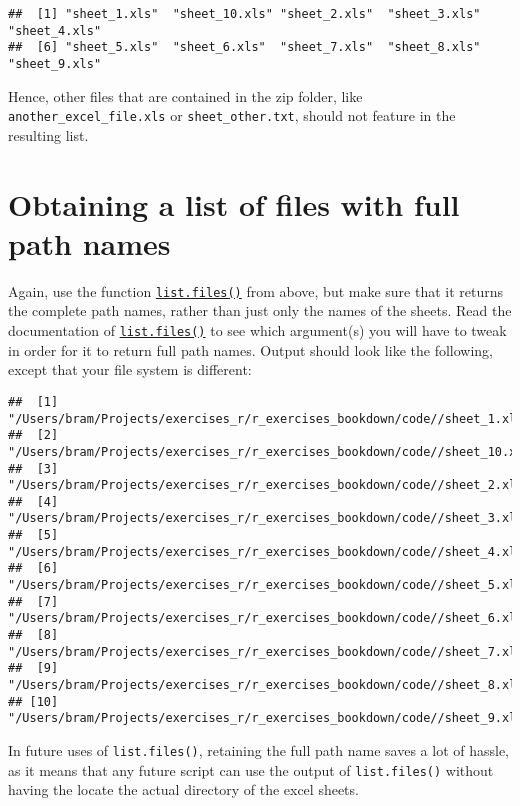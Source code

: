 \documentclass[
]{book}
\begin{document}
\begin{verbatim}
##  [1] "sheet_1.xls"  "sheet_10.xls" "sheet_2.xls"  "sheet_3.xls"  "sheet_4.xls" 
##  [6] "sheet_5.xls"  "sheet_6.xls"  "sheet_7.xls"  "sheet_8.xls"  "sheet_9.xls"
\end{verbatim}

Hence, other files that are contained in the zip folder, like \texttt{another\_excel\_file.xls} or \texttt{sheet\_other.txt}, should not feature in the resulting list.

\hypertarget{fileList}{%
\section{Obtaining a list of files with full path names}\label{fileList}}

Again, use the function \href{https://stat.ethz.ch/R-manual/R-patched/library/base/html/list.files.html}{\texttt{list.files()}} from above, but make sure that it returns the complete path names, rather than just only the names of the sheets. Read the documentation of \href{https://stat.ethz.ch/R-manual/R-patched/library/base/html/list.files.html}{\texttt{list.files()}} to see which argument(s) you will have to tweak in order for it to return full path names. Output should look like the following, except that your file system is different:

\begin{verbatim}
##  [1] "/Users/bram/Projects/exercises_r/r_exercises_bookdown/code//sheet_1.xls" 
##  [2] "/Users/bram/Projects/exercises_r/r_exercises_bookdown/code//sheet_10.xls"
##  [3] "/Users/bram/Projects/exercises_r/r_exercises_bookdown/code//sheet_2.xls" 
##  [4] "/Users/bram/Projects/exercises_r/r_exercises_bookdown/code//sheet_3.xls" 
##  [5] "/Users/bram/Projects/exercises_r/r_exercises_bookdown/code//sheet_4.xls" 
##  [6] "/Users/bram/Projects/exercises_r/r_exercises_bookdown/code//sheet_5.xls" 
##  [7] "/Users/bram/Projects/exercises_r/r_exercises_bookdown/code//sheet_6.xls" 
##  [8] "/Users/bram/Projects/exercises_r/r_exercises_bookdown/code//sheet_7.xls" 
##  [9] "/Users/bram/Projects/exercises_r/r_exercises_bookdown/code//sheet_8.xls" 
## [10] "/Users/bram/Projects/exercises_r/r_exercises_bookdown/code//sheet_9.xls"
\end{verbatim}

In future uses of \texttt{list.files()}, retaining the full path name saves a lot of hassle, as it means that any future script can use the output of \texttt{list.files()} without having the locate the actual directory of the excel sheets.
\end{document}
